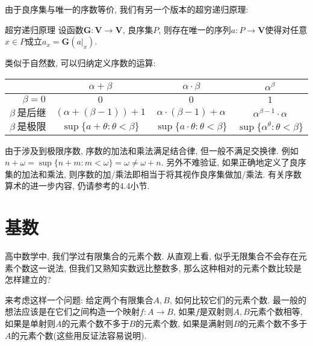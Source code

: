 由于良序集与唯一的序数等价, 我们有另一个版本的超穷递归原理: 

\begin{corollary}{超穷递归原理}
	设函数$\mathbf{G}:\mathbf{V} \to \mathbf{V}$, 良序集$P$, 则存在唯一的序列$a:P \to \mathbf{V}$使得对任意$x \in P$成立$a_{x} = \mathbf{G}(a|_{x})$. 
\end{corollary}

类似于自然数, 可以归纳定义序数的运算: 


\begin{table}[h]
	\centering
	\renewcommand\arraystretch{1.4}
\begin{tabular}{rccc}
\toprule
                        & $\alpha + \beta$                       & $\alpha \cdot \beta$                         & $\alpha ^{\beta}$                            \\
\midrule
$\beta = 0$             & $0$                                    & $0$                                          & $1$                                          \\
$\beta ~\textit{是后继序数}$ & $(\alpha+(\beta -1))+1$                & $\alpha \cdot (\beta -1) + \alpha$           & $\alpha ^{\beta -1} \cdot \alpha$            \\
$\beta ~\textit{是极限序数}$ & $\sup \{ a+\theta : \theta < \beta \}$ & $\sup \{ a \cdot \theta : \theta < \beta \}$ & $\sup \{ \alpha ^{\theta}:\theta < \beta \}$ \\
\bottomrule
\end{tabular}
\end{table}

由于涉及到极限序数, 序数的加法和乘法满足结合律, 但一般不满足交换律. 例如$n+\omega = \sup \{ n+m:m<\omega \}=\omega \neq \omega +n$. 另外不难验证, 如果正确地定义了良序集的加法和乘法, 则序数的加/乘法即相当于将其视作良序集做加/乘法. 有关序数算术的进一步内容, 仍请参考\cite{set_theory_Hao}的4.4小节. 





\section{基数}

高中数学中, 我们学过有限集合的元素个数. 从直观上看, 似乎无限集合不会存在元素个数这一说法, 但我们又熟知实数远比整数多, 那么这种相对的元素个数比较是怎样建立的? 

来考虑这样一个问题: 给定两个有限集合$A, B$, 如何比较它们的元素个数. 最一般的想法应该是在它们之间构造一个映射$f: A \to B$, 如果$f$是双射则$A, B$元素个数相等, 如果是单射则$A$的元素个数不多于$B$的元素个数, 如果是满射则$B$的元素个数不多于$A$的元素个数(这些用反证法容易说明). 

